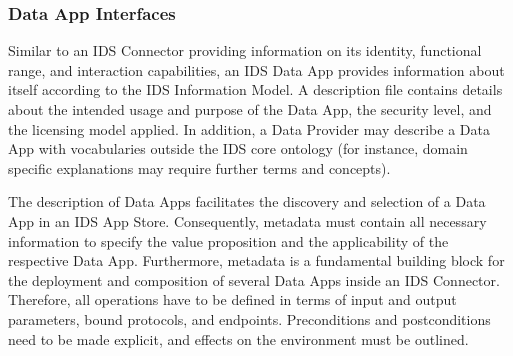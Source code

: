 \subsubsection{Data App Interfaces}
Similar to an IDS Connector providing information on its identity, functional range, and interaction capabilities, an IDS Data App provides information about itself according to the IDS Information Model. A description file contains details about the intended usage and purpose of the Data App, the security level, and the licensing model applied. In addition, a Data Provider may describe a Data App with vocabularies outside the IDS core ontology (for instance, domain specific explanations may require further terms and concepts).

The description of Data Apps facilitates the discovery and selection of a Data App in an IDS App Store. Consequently, metadata must contain all necessary information to specify the value proposition and the applicability of the respective Data App. Furthermore, metadata is a fundamental building block for the deployment and composition of several Data Apps inside an IDS Connector. Therefore, all operations have to be defined in terms of input and output parameters, bound protocols, and endpoints. Preconditions and postconditions need to be made explicit, and effects on the environment must be outlined.

